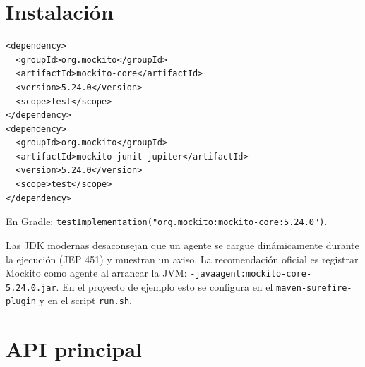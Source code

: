 \documentclass[11pt,a4paper,oneside]{report}
\newcommand{\code}[1]{\texttt{#1}}
\begin{document}
\section{Instalación}
\begin{lstlisting}[style=xml,caption={Dependencias Maven (\code{pom.xml})}]
<dependency>
  <groupId>org.mockito</groupId>
  <artifactId>mockito-core</artifactId>
  <version>5.24.0</version>
  <scope>test</scope>
</dependency>
<dependency>
  <groupId>org.mockito</groupId>
  <artifactId>mockito-junit-jupiter</artifactId>
  <version>5.24.0</version>
  <scope>test</scope>
</dependency>
\end{lstlisting}

En Gradle: \code{testImplementation("org.mockito:mockito-core:5.24.0")}.

\begin{nota}
Las JDK modernas desaconsejan que un agente se cargue dinámicamente durante la ejecución (JEP 451) y muestran un aviso. La recomendación oficial es registrar Mockito como agente al arrancar la JVM: \code{-javaagent:mockito-core-5.24.0.jar}. En el proyecto de ejemplo esto se configura en el \code{maven-surefire-plugin} y en el script \code{run.sh}.
\end{nota}

\section{API principal}
\end{document}

